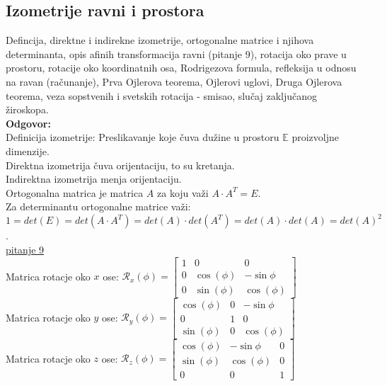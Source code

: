 \documentclass[12pt]{article}
\begin{document}
    \par
    \subsection{Izometrije ravni i prostora}
    Defincija, direktne i indirekne izometrije, ortogonalne
    matrice i njihova determinanta, opis afinih transformacija
    ravni (pitanje 9), rotacija oko prave u prostoru, rotacije
    oko koordinatnih osa, Rodrigezova formula, refleksija u
    odnosu na ravan (računanje), Prva Ojlerova teorema,
    Ojlerovi uglovi, Druga Ojlerova teorema, veza sopstvenih i
    svetskih rotacija - smisao, slučaj zaključanog žiroskopa.\\
    \textbf{Odgovor:}\\
    Definicija izometrije: Preslikavanje koje čuva dužine u prostoru
$\mathbb{E}$ proizvoljne dimenzije.\\
    Direktna izometrija čuva orijentaciju, to su kretanja.\\
    Indirektna izometrija menja orijentaciju.\\
    Ortogonalna matrica je matrica $A$ za koju važi $A\cdot A^T=E$.\\
    Za determinantu ortogonalne matrice važi:\\
$1=det(E)=det(A\cdot A^T)=det(A)\cdot det(A^T)=det(A)\cdot det(A)=det(A)^2$.\\
    \hyperref[subsec:pitanje_9]{pitanje 9}\\
    Matrica rotacje oko $x$ ose: $\mathcal{R}_x(\phi)=\begin{bmatrix}
    1 & 0          & 0           \\
    0 & \cos(\phi) & -\sin{\phi} \\
    0 & \sin(\phi) & \cos(\phi)
\end{bmatrix}$\\[0.5cm]
    Matrica rotacje oko $y$ ose: $\mathcal{R}_y(\phi)=\begin{bmatrix}
    \cos(\phi) & 0 & -\sin{\phi} \\
    0          & 1 & 0           \\
    \sin(\phi) & 0 & \cos(\phi)
\end{bmatrix}$\\[0.5cm]
    Matrica rotacje oko $z$ ose: $\mathcal{R}_z(\phi)=\begin{bmatrix}
    \cos(\phi) & -\sin{\phi} & 0 \\
    \sin(\phi) & \cos(\phi)  & 0 \\
    0          & 0           & 1
\end{bmatrix}$\\[0.5cm]
\end{document}
